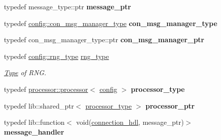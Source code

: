 \begin{DoxyCompactItemize}
typedef message\+\_\+type\+::ptr {\bfseries message\+\_\+ptr}
\item 
\mbox{\label{classwebsocketpp_1_1connection_aa3fe3ecba9c63a04771c2ae34dd8dd56}} 
typedef \mbox{\hyperlink{classwebsocketpp_1_1message__buffer_1_1alloc_1_1con__msg__manager}{config\+::con\+\_\+msg\+\_\+manager\+\_\+type}} {\bfseries con\+\_\+msg\+\_\+manager\+\_\+type}
\item 
\mbox{\label{classwebsocketpp_1_1connection_a7bcb608b3a2a645bda4e4c4998f754c7}} 
typedef con\+\_\+msg\+\_\+manager\+\_\+type\+::ptr {\bfseries con\+\_\+msg\+\_\+manager\+\_\+ptr}
\item 
\mbox{\label{classwebsocketpp_1_1connection_afc276f2f61d5b1acfadc64f91b3f89e5}} 
typedef \mbox{\hyperlink{classwebsocketpp_1_1random_1_1none_1_1int__generator}{config\+::rng\+\_\+type}} \mbox{\hyperlink{classwebsocketpp_1_1connection_afc276f2f61d5b1acfadc64f91b3f89e5}{rng\+\_\+type}}
\begin{DoxyCompactList}\small\item\em \mbox{\hyperlink{struct_type}{Type}} of R\+NG. \end{DoxyCompactList}\item 
\mbox{\label{classwebsocketpp_1_1connection_a77cd1bb26e05961a5fbc60708244d1fe}} 
typedef \mbox{\hyperlink{classwebsocketpp_1_1processor_1_1processor}{processor\+::processor}}$<$ \mbox{\hyperlink{classconfig}{config}} $>$ {\bfseries processor\+\_\+type}
\item 
\mbox{\label{classwebsocketpp_1_1connection_a7e955b2fc98102bb3776e993f95c9009}} 
typedef lib\+::shared\+\_\+ptr$<$ \mbox{\hyperlink{classwebsocketpp_1_1processor_1_1processor}{processor\+\_\+type}} $>$ {\bfseries processor\+\_\+ptr}
\item 
\mbox{\label{classwebsocketpp_1_1connection_a0091551000546d5f5f427379d852cae9}} 
typedef lib\+::function$<$ void(\mbox{\hyperlink{namespacewebsocketpp_a6b3d26a10ee7229b84b776786332631d}{connection\+\_\+hdl}}, message\+\_\+ptr)$>$ {\bfseries message\+\_\+handler}
\item 
\mbox{\label{classwebsocketpp_1_1connection_aa13510ba1841ded8492a0483a294feb0}} 

\end{DoxyCompactItemize}
